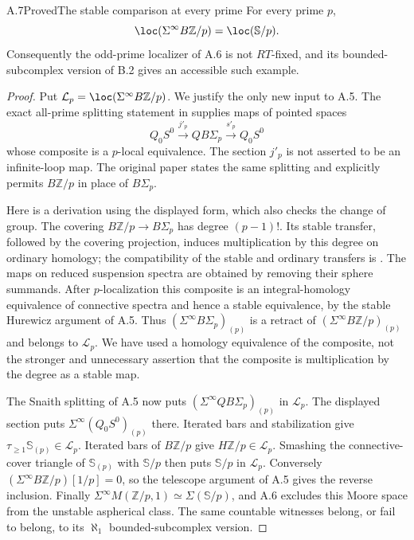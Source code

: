 \begin{claim}{A.7}{Proved}{The stable comparison at every prime}
For every prime $p$,
\[
 \loc(\Sigma^\infty B\mathbb Z/p)=\loc(\mathbb S/p).
\]
Consequently the odd-prime localizer of A.6 is not $RT$-fixed, and its bounded-subcomplex version of B.2 gives an accessible such example.
\end{claim}
\begin{proof}
Put $\mathcal L_p=\loc(\Sigma^\infty B\mathbb Z/p)$. We justify the only new input to A.5. The exact all-prime splitting statement in \citet[Theorem F]{CarusoCohenMayTaylor1984} supplies maps of pointed spaces
\[
 Q_0S^0\xrightarrow{j'_p}QB\Sigma_p
        \xrightarrow{s'_p}Q_0S^0
\]
whose composite is a $p$-local equivalence. The section $j'_p$ is not asserted to be an infinite-loop map. The original paper \citep[unnumbered main theorem, p.~103]{KahnPriddy1978} states the same splitting and explicitly permits $B\mathbb Z/p$ in place of $B\Sigma_p$.

Here is a derivation using the displayed form, which also checks the change of group. The covering $B\mathbb Z/p\to B\Sigma_p$ has degree $(p-1)!$. Its stable transfer, followed by the covering projection, induces multiplication by this degree on ordinary homology; the compatibility of the stable and ordinary transfers is \citet[Proposition 2.1 and Remark 2.3]{KahnPriddy1972}. The maps on reduced suspension spectra are obtained by removing their sphere summands. After $p$-localization this composite is an integral-homology equivalence of connective spectra and hence a stable equivalence, by the stable Hurewicz argument of A.5. Thus $(\Sigma^\infty B\Sigma_p)_{(p)}$ is a retract of $(\Sigma^\infty B\mathbb Z/p)_{(p)}$ and belongs to $\mathcal L_p$. We have used a homology equivalence of the composite, not the stronger and unnecessary assertion that the composite is multiplication by the degree as a stable map.

The Snaith splitting of A.5 now puts $(\Sigma^\infty QB\Sigma_p)_{(p)}$ in $\mathcal L_p$. The displayed section puts $\Sigma^\infty(Q_0S^0)_{(p)}$ there. Iterated bars and stabilization give $\tau_{\geq1}\mathbb S_{(p)}\in\mathcal L_p$. Iterated bars of $B\mathbb Z/p$ give $H\mathbb Z/p\in\mathcal L_p$. Smashing the connective-cover triangle of $\mathbb S_{(p)}$ with $\mathbb S/p$ then puts $\mathbb S/p$ in $\mathcal L_p$. Conversely $(\Sigma^\infty B\mathbb Z/p)[1/p]=0$, so the telescope argument of A.5 gives the reverse inclusion. Finally $\Sigma^\infty M(\mathbb Z/p,1)\simeq\Sigma(\mathbb S/p)$, and A.6 excludes this Moore space from the unstable aspherical class. The same countable witnesses belong, or fail to belong, to its $\aleph_1$ bounded-subcomplex version.
\end{proof}
